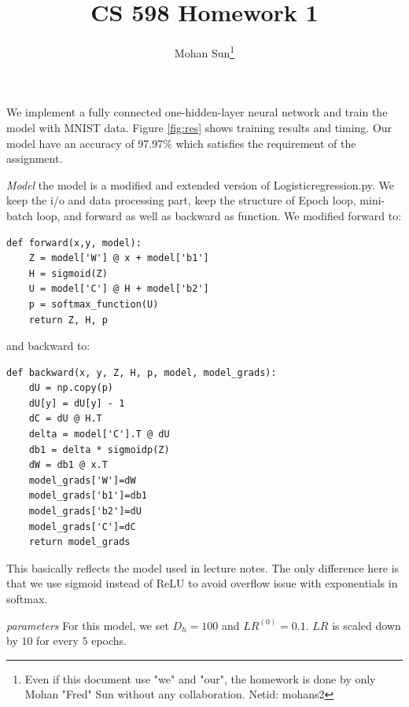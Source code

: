 \documentclass[reqno,12pt]{article}
\begin{document}
\title{\textbf{CS 598 Homework 1}}
  
\author{Mohan Sun\footnote{Even if this document use "we" and "our", the homework is done
by only Mohan "Fred" Sun without any collaboration. Netid: mohans2}}

\date{\vspace{-5ex}}

\maketitle

\doublespacing

\noindent We implement a fully connected one-hidden-layer neural network and train the model
with MNIST data. Figure \ref{fig:res} shows training results and timing. Our model have 
an accuracy of 97.97\% which satisfies the requirement of the assignment.

\textit{Model} the model is a modified and extended version of Logisticregression.py. We keep the 
i/o and data processing part, keep the structure of Epoch loop, mini-batch loop, and forward as well as 
backward as function. We modified forward to: 

\begin{lstlisting}
def forward(x,y, model):
    Z = model['W'] @ x + model['b1']
    H = sigmoid(Z)
    U = model['C'] @ H + model['b2']
    p = softmax_function(U)
    return Z, H, p
\end{lstlisting}

\newpage
and backward to:

\begin{lstlisting}
def backward(x, y, Z, H, p, model, model_grads):
    dU = np.copy(p)
    dU[y] = dU[y] - 1
    dC = dU @ H.T
    delta = model['C'].T @ dU
    db1 = delta * sigmoidp(Z)
    dW = db1 @ x.T
    model_grads['W']=dW
    model_grads['b1']=db1
    model_grads['b2']=dU
    model_grads['C']=dC
    return model_grads
\end{lstlisting}

This basically reflects the model used in lecture notes. The only difference here is that we use sigmoid
instead of ReLU to avoid overflow issue with exponentials in softmax.

\textit{parameters} For this model, we set $D_h = 100$ and $LR^{(0)}=0.1$. $LR$ is scaled down by $10$
for every $5$ epochs.
\end{document}
